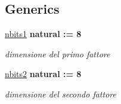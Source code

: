 \subsection*{Generics}
 \begin{DoxyCompactItemize}
\item 
\hyperlink{group___multiplier_ga4ede473cdc13e75fe66fbd548b62e432}{nbits1} {\bfseries {\bfseries \textcolor{vhdlchar}{natural}\textcolor{vhdlchar}{ }\textcolor{vhdlchar}{ }\textcolor{vhdlchar}{\+:}\textcolor{vhdlchar}{=}\textcolor{vhdlchar}{ }\textcolor{vhdlchar}{ } \textcolor{vhdldigit}{8} \textcolor{vhdlchar}{ }}}
\begin{DoxyCompactList}\small\item\em dimensione del primo fattore \end{DoxyCompactList}\item 
\hyperlink{group___multiplier_ga8b5bdaff4c3669528aaec95a07e17c2a}{nbits2} {\bfseries {\bfseries \textcolor{vhdlchar}{natural}\textcolor{vhdlchar}{ }\textcolor{vhdlchar}{ }\textcolor{vhdlchar}{\+:}\textcolor{vhdlchar}{=}\textcolor{vhdlchar}{ }\textcolor{vhdlchar}{ } \textcolor{vhdldigit}{8} \textcolor{vhdlchar}{ }}}
\begin{DoxyCompactList}\small\item\em dimensione del secondo fattore \end{DoxyCompactList}\end{DoxyCompactItemize}
